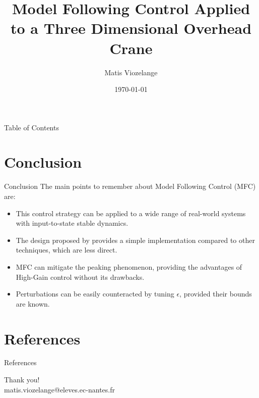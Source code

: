 \documentclass[11pt]{beamer}
\author[Matis Viozelange]{Matis Viozelange}
\title{Model Following Control Applied to a Three Dimensional Overhead Crane}
\institute[]{Ecole Centrale de Nantes \\ Technische Universität Ilmenau}
\date{\today}
\makeatletter
\newcommand{\email}{matis.viozelange@eleves.ec-nantes.fr}
\makeatother
\begin{document}
\begin{frame}
\titlepage
\end{frame}

\begin{frame}{Table of Contents}
\tableofcontents
\end{frame}





\section{Conclusion}
\begin{frame}{Conclusion}
The main points to remember about Model Following Control (MFC) are:
\begin{itemize}
\item This control strategy can be applied to a wide range of real-world systems with input-to-state stable dynamics.
\item The design proposed by \cite{Tietze2023CruiseControl} provides a simple implementation compared to other techniques, which are less direct.
\item MFC can mitigate the peaking phenomenon, providing the advantages of High-Gain control without its drawbacks.
\item Perturbations can be easily counteracted by tuning \(\epsilon\), provided their bounds are known.
\end{itemize}
\end{frame}


\section{References}
\begin{frame}[allowframebreaks]{References}
    
    
\end{frame}

\begin{frame}
\begin{center}
    Thank you! \\
    \email
\end{center}
\end{frame}
\end{document}
